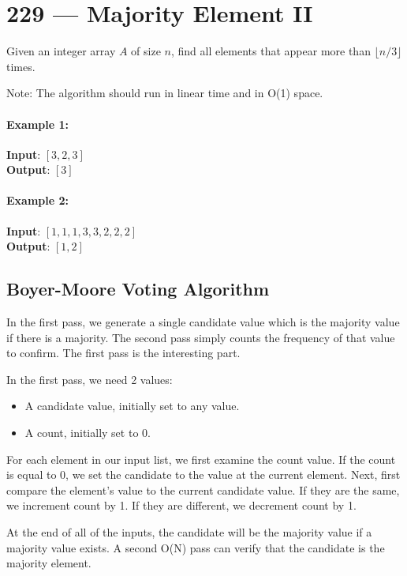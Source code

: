 \section{229 --- Majority Element II}
Given an integer array $A$ of size $n$, find all elements that appear more than $\lfloor n/3 \rfloor$ times.
\par
Note: The algorithm should run in linear time and in O(1) space.

\paragraph{Example 1:}

\begin{flushleft}
\textbf{Input}: $[3,2,3]$
\\
\textbf{Output}: $[3]$
\end{flushleft}

\paragraph{Example 2:}

\begin{flushleft}
\textbf{Input}: $[1,1,1,3,3,2,2,2]$
\\
\textbf{Output}: $[1,2]$
\end{flushleft}
\subsection{Boyer-Moore Voting Algorithm}
In the first pass, we generate a single candidate value which is the majority value if there is a majority. The second pass simply counts the frequency of that value to confirm. The first pass is the interesting part.
\par
In the first pass, we need 2 values:
\begin{itemize}
\item A candidate value, initially set to any value.
\item A count, initially set to 0.
\end{itemize}
For each element in our input list, we first examine the count value. If the count is equal to 0, we set the candidate to the value at the current element. Next, first compare the element's value to the current candidate value. If they are the same, we increment count by 1. If they are different, we decrement count by 1.
\par
At the end of all of the inputs, the candidate will be the majority value if a majority value exists. A second O(N) pass can verify that the candidate is the majority element.
